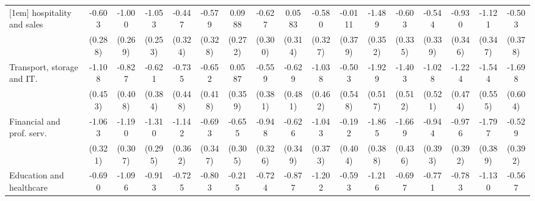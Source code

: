 {\begin{tabular}{l*{16}{c}}
[1em]
hospitality and sales&      -0.603\sym{*}  &      -1.000\sym{***}&      -1.053\sym{***}&      -0.447         &      -0.579         &      0.0988         &      -0.627\sym{*}  &      0.0583         &      -0.580         &     -0.0111         &      -1.489\sym{***}&      -0.603         &      -0.544         &      -0.930\sym{**} &      -1.121\sym{**} &      -0.503         \\
                    &     (0.288)         &     (0.269)         &     (0.253)         &     (0.324)         &     (0.328)         &     (0.272)         &     (0.300)         &     (0.314)         &     (0.327)         &     (0.379)         &     (0.352)         &     (0.335)         &     (0.339)         &     (0.346)         &     (0.347)         &     (0.378)         \\
[1em]
Transport, storage and IT.&      -1.108\sym{*}  &      -0.827\sym{*}  &      -0.621         &      -0.735         &      -0.652         &      0.0587         &      -0.559         &      -0.629         &      -1.038\sym{*}  &      -0.503         &      -1.929\sym{***}&      -1.403\sym{**} &      -1.028\sym{*}  &      -1.224\sym{**} &      -1.544\sym{**} &      -1.698\sym{**} \\
                    &     (0.453)         &     (0.408)         &     (0.384)         &     (0.448)         &     (0.418)         &     (0.359)         &     (0.381)         &     (0.481)         &     (0.462)         &     (0.548)         &     (0.517)         &     (0.512)         &     (0.521)         &     (0.474)         &     (0.555)         &     (0.604)         \\
[1em]
Financial and prof. serv.&      -1.063\sym{***}&      -1.190\sym{***}&      -1.310\sym{***}&      -1.142\sym{**} &      -0.693\sym{*}  &      -0.655\sym{*}  &      -0.948\sym{**} &      -0.626         &      -1.043\sym{**} &      -0.192         &      -1.865\sym{***}&      -1.669\sym{***}&      -0.944\sym{*}  &      -0.976\sym{*}  &      -1.797\sym{***}&      -0.529         \\
                    &     (0.321)         &     (0.307)         &     (0.295)         &     (0.362)         &     (0.347)         &     (0.305)         &     (0.326)         &     (0.349)         &     (0.373)         &     (0.404)         &     (0.388)         &     (0.436)         &     (0.393)         &     (0.392)         &     (0.389)         &     (0.392)         \\
[1em]
Education and healthcare&      -0.690\sym{*}  &      -1.096\sym{***}&      -0.913\sym{**} &      -0.725\sym{*}  &      -0.803\sym{*}  &      -0.215         &      -0.724\sym{*}  &      -0.877\sym{*}  &      -1.202\sym{***}&      -0.593         &      -1.216\sym{***}&      -0.697         &      -0.771\sym{*}  &      -0.783\sym{*}  &      -1.130\sym{**} &      -0.567         \\

\end{tabular}}
